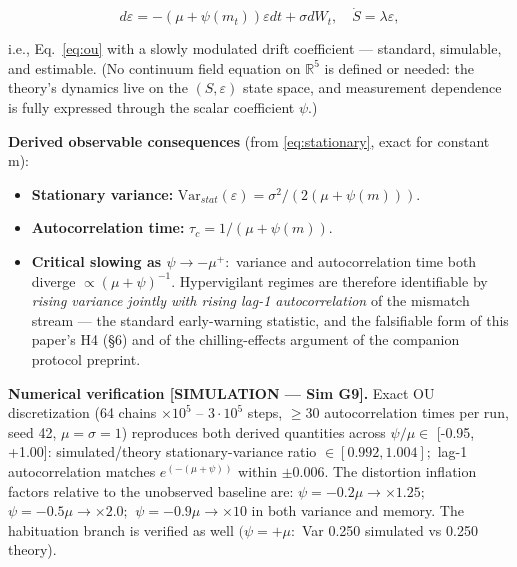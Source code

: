 \documentclass[11pt,twocolumn]{article}
\theoremstyle{gttdef}
\theoremstyle{gttplain}
\begin{document}
\begin{equation}
d\varepsilon = -(\mu + \psi(m_t)) \varepsilon dt + \sigma dW_t, \quad \dot{S} = \lambda \varepsilon,
\label{eq:oupsi}
\end{equation}

i.e., Eq.~\eqref{eq:ou} with a slowly modulated drift coefficient --- standard, simulable, and estimable. (No continuum field equation on $\mathbb{R}^{5}$ is defined or needed: the theory's dynamics live on the $(S, \varepsilon)$ state space, and measurement dependence is fully expressed through the scalar coefficient $\psi.$)

\textbf{Derived observable consequences} (from \eqref{eq:stationary}, exact for constant m):

\begin{itemize}

\item \textbf{Stationary variance:} $\mathrm{Var}_{stat}(\varepsilon) = \sigma^{2} / (2(\mu + \psi(m))).$

\item \textbf{Autocorrelation time:} $\tau_c = 1 / (\mu + \psi(m)).$

\item \textbf{Critical slowing as $\psi \to -\mu^{+}:$} variance and autocorrelation time both diverge $\propto (\mu + \psi)^{-1}.$ Hypervigilant regimes are therefore identifiable by \emph{rising variance jointly with rising lag-1 autocorrelation} of the mismatch stream --- the standard early-warning statistic, and the falsifiable form of this paper's H4 (\S{}6) and of the chilling-effects argument of the companion protocol preprint.

\end{itemize}

\textbf{Numerical verification [SIMULATION --- Sim G9].} Exact OU discretization (64 chains $\times 10^{5}$ -- $3\cdot10^{5}$ steps, $\geq 30$ autocorrelation times per run, seed 42, $\mu = \sigma = 1$) reproduces both derived quantities across $\psi/\mu \in$ [-0.95, +1.00]: simulated/theory stationary-variance ratio $\in [0.992, 1.004];$ lag-1 autocorrelation matches $e^(-(\mu+\psi))$ within $\pm0.006.$ The distortion inflation factors relative to the unobserved baseline are: \textbf{$\psi = -0.2\mu \to \times1.25;$ $\psi = -0.5\mu \to \times2.0;$ $\psi = -0.9\mu \to \times10$} in both variance and memory. The habituation branch is verified as well $(\psi = +\mu:$ Var 0.250 simulated vs 0.250 theory).
\end{document}
